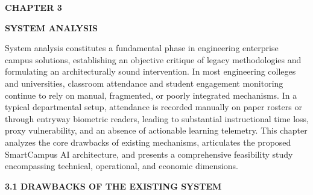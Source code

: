 \newpage
\begin{flushleft}
{\fontsize{16pt}{16pt}\selectfont \textbf{CHAPTER 3}}
\end{flushleft}		
\begin{center}
{\fontsize{18pt}{22pt}\selectfont \textbf{SYSTEM ANALYSIS}}\\[2mm]
\end{center}

\onehalfspacing
\justifying
\noindent System analysis constitutes a fundamental phase in engineering enterprise campus solutions, establishing an objective critique of legacy methodologies and formulating an architecturally sound intervention. In most engineering colleges and universities, classroom attendance and student engagement monitoring continue to rely on manual, fragmented, or poorly integrated mechanisms. In a typical departmental setup, attendance is recorded manually on paper rosters or through entryway biometric readers, leading to substantial instructional time loss, proxy vulnerability, and an absence of actionable learning telemetry. This chapter analyzes the core drawbacks of existing mechanisms, articulates the proposed SmartCampus AI architecture, and presents a comprehensive feasibility study encompassing technical, operational, and economic dimensions.

\vspace{0.2in}
\begin{flushleft}
{\fontsize{14pt}{18pt}\selectfont \textbf{3.1 DRAWBACKS OF THE EXISTING SYSTEM}}\\[2mm]
\end{flushleft}

